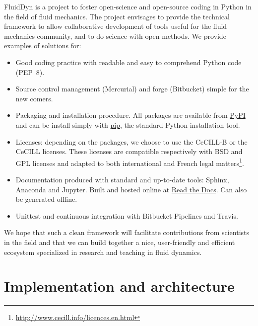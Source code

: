 \documentclass{../jors}
\begin{document}

FluidDyn is a project to foster open-science and open-source coding in Python in
the field of fluid mechanics.
%
The project envisages to provide the technical framework to allow collaborative
development of tools useful for the fluid mechanics community, and to do science
with open methods.
%
We provide examples of solutions for:
\begin{itemize}
\item Good coding practice with readable and easy to comprehend Python code
(PEP~8).
\item Source control management (Mercurial) and forge (Bitbucket) simple for
the new comers.
\item Packaging and installation procedure. All packages are available from
\href{https://pypi.org/}{PyPI} and can be install simply with
\href{https://pypi.org/project/pip/}{pip}, the standard Python installation
tool.
\item Licenses: depending on the packages, we choose to use the CeCILL-B or the
CeCILL licenses. These licenses are compatible respectively with BSD and GPL
licenses and adapted to both international and French legal
matters\footnote{\url{http://www.cecill.info/licences.en.html}}.
\item Documentation produced with standard and up-to-date tools: Sphinx,
Anaconda and Jupyter. Built and hosted online at
\href{https://readthedocs.org/}{Read the Docs}. Can also be generated offline.
\item Unittest and continuous integration with Bitbucket Pipelines and Travis.
\end{itemize}
We hope that such a clean framework will facilitate contributions from
scientists in the field and that we can build together a nice, user-friendly
and efficient ecosystem specialized in research and teaching in fluid dynamics.



\section*{Implementation and architecture}

\end{document}

